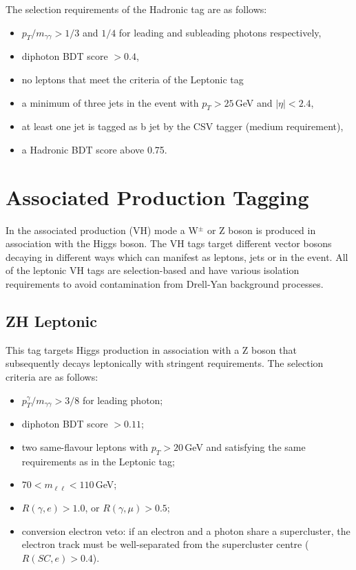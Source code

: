 The selection requirements of the \ttH Hadronic tag are as follows:
\begin{itemize}[noitemsep]
    \item $p_{T}/m_{\gamma\gamma} > 1/3$ and $1/4$ for leading and subleading photons respectively,
    \item diphoton BDT score $> 0.4$,
    \item no leptons that meet the criteria of the \ttH Leptonic tag
    \item a minimum of three jets in the event with $p_{T} > 25$\,GeV and $|\eta| < 2.4$,
    \item at least one jet is tagged as b jet by the CSV tagger (medium requirement),
    \item a \ttH Hadronic BDT score above 0.75.
\end{itemize}











\section{Associated Production Tagging}
In the associated production (VH) mode a W$^{\pm}$ or Z boson is produced in association with the Higgs boson. The VH tags target different vector bosons decaying in different ways which can manifest as leptons, jets or \MET in the event.
All of the leptonic VH tags are selection-based and have various isolation requirements to avoid contamination from Drell-Yan background processes.

\subsection{ZH Leptonic}
This tag targets Higgs production in association with a Z boson that subsequently decays leptonically with stringent requirements. The selection criteria are as follows:
\begin{itemize}[noitemsep]
    \item $p^{\gamma}_{T}/m_{\gamma\gamma} > 3/8$ for leading photon;
    \item diphoton BDT score $> 0.11$;
    \item two same-flavour leptons with $p_T > 20$\,GeV and satisfying the same requirements as in the \ttH Leptonic tag;
    \item $70 < m_{\ell\ell} < 110$\,GeV;
    \item $R(\gamma,e) > 1.0$, or $R(\gamma,\mu) > 0.5$;
    \item conversion electron veto: if an electron and a photon share a supercluster, the electron track must be well-separated from the supercluster centre ($R(SC,e) > 0.4$).
\end{itemize}


